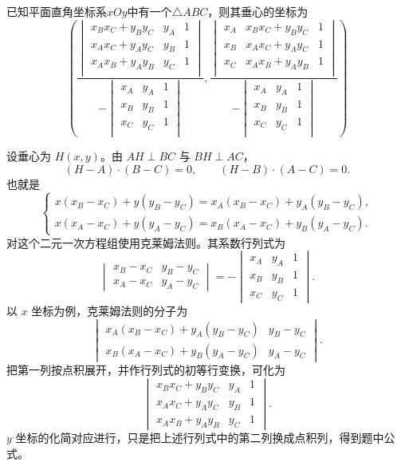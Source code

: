 \begin{example}[三角形垂心坐标]
    已知平面直角坐标系$xOy$中有一个$\triangle{ABC}$，则其垂心的坐标为\[
    \left(\dfrac{\begin{vmatrix}
    x_Bx_C+y_By_C & y_A & 1\\
    x_Ax_C+y_Ay_C & y_B & 1\\
    x_Ax_B+y_Ay_B & y_C & 1\\
    \end{vmatrix}}{-\begin{vmatrix}
    x_A & y_A & 1\\
    x_B & y_B & 1\\
    x_C & y_C & 1\\
    \end{vmatrix}},\dfrac{\begin{vmatrix}
    x_A & x_Bx_C+y_By_C & 1\\
    x_B & x_Ax_C+y_Ay_C & 1\\
    x_C & x_Ax_B+y_Ay_B & 1\\
    \end{vmatrix}}{-\begin{vmatrix}
    x_A & y_A & 1\\
    x_B & y_B & 1\\
    x_C & y_C & 1\\
    \end{vmatrix}}\right)\]
\end{example}
\begin{solution}
设垂心为 $H(x,y)$。由 $AH\perp BC$ 与 $BH\perp AC$，
\[
(H-A)\cdot(B-C)=0,\qquad (H-B)\cdot(A-C)=0.
\]
也就是
\[
\begin{cases}
x(x_B-x_C)+y(y_B-y_C)=x_A(x_B-x_C)+y_A(y_B-y_C),\\
x(x_A-x_C)+y(y_A-y_C)=x_B(x_A-x_C)+y_B(y_A-y_C).
\end{cases}
\]
对这个二元一次方程组使用克莱姆法则。其系数行列式为
\[
\begin{vmatrix}
x_B-x_C&y_B-y_C\\
x_A-x_C&y_A-y_C
\end{vmatrix}
=-\begin{vmatrix}
x_A&y_A&1\\
x_B&y_B&1\\
x_C&y_C&1
\end{vmatrix}.
\]
以 $x$ 坐标为例，克莱姆法则的分子为
\[
\begin{vmatrix}
x_A(x_B-x_C)+y_A(y_B-y_C)&y_B-y_C\\
x_B(x_A-x_C)+y_B(y_A-y_C)&y_A-y_C
\end{vmatrix}.
\]
把第一列按点积展开，并作行列式的初等行变换，可化为
\[
\begin{vmatrix}
x_Bx_C+y_By_C&y_A&1\\
x_Ax_C+y_Ay_C&y_B&1\\
x_Ax_B+y_Ay_B&y_C&1
\end{vmatrix}.
\]
$y$ 坐标的化简对应进行，只是把上述行列式中的第二列换成点积列，得到题中公式。
\end{solution}
